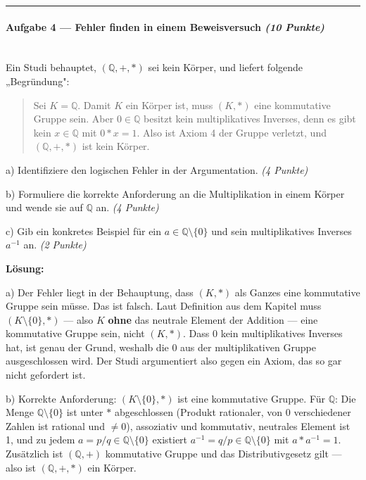 \documentclass[11pt, a4paper]{article}
\begin{document}
\noindent\textcolor{rulegray}{\rule{\linewidth}{0.4pt}}


\paragraph{Aufgabe 4 — Fehler finden in einem Beweisversuch \textit{(10 Punkte)}}\mbox{}\\[2pt]

Ein Studi behauptet, $(\mathbb{Q}, +, \ast)$ sei kein Körper, und liefert folgende „Begründung":


\begin{quote}
Sei $K = \mathbb{Q}$. Damit $K$ ein Körper ist, muss $(K, \ast)$ eine kommutative Gruppe sein. Aber $0 \in \mathbb{Q}$ besitzt kein multiplikatives Inverses, denn es gibt kein $x \in \mathbb{Q}$ mit $0 \ast x = 1$. Also ist Axiom 4 der Gruppe verletzt, und $(\mathbb{Q}, +, \ast)$ ist kein Körper.
\end{quote}

a) Identifiziere den logischen Fehler in der Argumentation. \textit{(4 Punkte)}


b) Formuliere die korrekte Anforderung an die Multiplikation in einem Körper und wende sie auf $\mathbb{Q}$ an. \textit{(4 Punkte)}


c) Gib ein konkretes Beispiel für ein $a \in \mathbb{Q} \setminus \{0\}$ und sein multiplikatives Inverses $a^{-1}$ an. \textit{(2 Punkte)}


\textbf{Lösung:}


a) Der Fehler liegt in der Behauptung, dass $(K, \ast)$ als Ganzes eine kommutative Gruppe sein müsse. Das ist falsch. Laut Definition aus dem Kapitel muss $(K \setminus \{0\}, \ast)$ — also $K$ \textbf{ohne} das neutrale Element der Addition — eine kommutative Gruppe sein, nicht $(K, \ast)$. Dass 0 kein multiplikatives Inverses hat, ist genau der Grund, weshalb die 0 aus der multiplikativen Gruppe ausgeschlossen wird. Der Studi argumentiert also gegen ein Axiom, das so gar nicht gefordert ist.


b) Korrekte Anforderung: $(K \setminus \{0\}, \ast)$ ist eine kommutative Gruppe. Für $\mathbb{Q}$: Die Menge $\mathbb{Q} \setminus \{0\}$ ist unter $\ast$ abgeschlossen (Produkt rationaler, von 0 verschiedener Zahlen ist rational und $\neq 0$), assoziativ und kommutativ, neutrales Element ist 1, und zu jedem $a = p/q \in \mathbb{Q} \setminus \{0\}$ existiert $a^{-1} = q/p \in \mathbb{Q} \setminus \{0\}$ mit $a \ast a^{-1} = 1$. Zusätzlich ist $(\mathbb{Q}, +)$ kommutative Gruppe und das Distributivgesetz gilt — also ist $(\mathbb{Q}, +, \ast)$ ein Körper.
\end{document}
